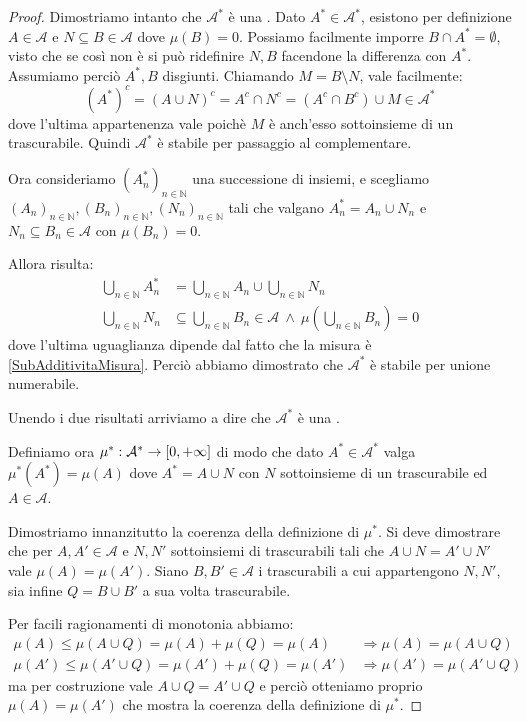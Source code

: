 \begin{proof}
	Dimostriamo intanto che $\mathcal A^*$ è una \sigalg{}.
	Dato $A^*\in\mathcal A^*$, esistono per definizione $A\in\mathcal A$ e $N\subseteq B\in\mathcal A$ dove $\mu(B)=0$. Possiamo facilmente imporre $B\cap A^*=\emptyset$, visto che se così non è si può ridefinire $N,B$ facendone la differenza con $A^*$. Assumiamo perciò $A^*,B$ disgiunti.
	Chiamando $M=B\setminus N$, vale facilmente:
	\begin{equation*}
		(A^*)^c=(A\cup N)^c=A^c\cap N^c=(A^c\cap B^c )\cup M \in\mathcal A^*
	\end{equation*}
	dove l'ultima appartenenza vale poichè $M$ è anch'esso sottoinsieme di un trascurabile. Quindi $\mathcal A^*$ è stabile per passaggio al complementare.
	
	Ora consideriamo $(A^*_n)_{n\in\mathbb N}$ una successione di insiemi, e scegliamo $(A_n)_{n\in\mathbb N},(B_n)_{n\in\mathbb N},(N_n)_{n\in\mathbb N}$ tali che valgano $A^*_n=A_n\cup N_n$ e $N_n\subseteq B_n\in\mathcal A$ con $\mu(B_n)=0$.
	
	Allora risulta:
	\begin{align*}
		\bigcup_{n\in\mathbb N}A^*_n &=\bigcup_{n\in\mathbb N}A_n \cup \bigcup_{n\in\mathbb N}N_n\\
		\bigcup_{n\in\mathbb N}N_n &\subseteq \bigcup_{n\in\mathbb N}B_n\in\mathcal A\ \wedge\ \mu\left(\bigcup_{n\in\mathbb N}B_n\right)=0
	\end{align*}
	dove l'ultima uguaglianza dipende dal fatto che la misura è \sigsubadd{} \cref{SubAdditivitaMisura}. Perciò abbiamo dimostrato che $\mathcal A^*$ è stabile per unione numerabile.
	
	Unendo i due risultati arriviamo a dire che $\mathcal A^*$ è una \sigalg{}.
	
	Definiamo ora $\mu^*:\mathcal A^*\to[0,+\infty]$ di modo che dato $A^*\in\mathcal A^*$ valga $\mu^*(A^*)=\mu(A)$ dove $A^*=A\cup N$ con $N$ sottoinsieme di un trascurabile ed $A\in\mathcal A$.
	
	Dimostriamo innanzitutto la coerenza della definizione di $\mu^*$. Si deve dimostrare che per $A,A'\in\mathcal A$ e $N,N'$ sottoinsiemi di trascurabili tali che $A\cup N=A'\cup N'$ vale $\mu(A)=\mu(A')$. Siano $B,B'\in\mathcal A$ i trascurabili a cui appartengono $N,N'$, sia infine $Q=B\cup B'$ a sua volta trascurabile.
	
	Per facili ragionamenti di monotonia abbiamo:
	\begin{align*}
		\mu(A)\le \mu(A\cup Q) =\mu(A)+\mu(Q)=\mu(A) &\Longrightarrow \mu(A)=\mu(A\cup Q)\\
		\mu(A')\le \mu(A'\cup Q) =\mu(A')+\mu(Q)=\mu(A') &\Longrightarrow \mu(A')=\mu(A'\cup Q)
	\end{align*}
	ma per costruzione vale $A\cup Q=A'\cup Q$ e perciò otteniamo proprio $\mu(A)=\mu(A')$ che mostra la coerenza della definizione di $\mu^*$.
	

\end{proof}
